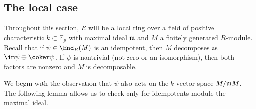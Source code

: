 \documentclass[12pt]{article}
\def\FF{\mathbb F}
\theoremstyle{theorem}
\numberwithin{thm}{section}
\theoremstyle{definition}
\begin{document}
\subsection{The local case}\label{sec:local-alg}

Throughout this section, $R$ will be a local ring over a field of positive characteristic $k \subset \overline{\FF_p}$ with maximal ideal $\mathfrak m$ and $M$ a finitely generated $R$-module. Recall that if $\psi\in\End_R(M)$ is an idempotent, then $M$ decomposes as $\im \psi \oplus \coker \psi$. If $\psi$ is nontrivial (not zero or an isomorphism), then both factors are nonzero and $M$ is decomposable.

We begin with the observation that $\psi$ also acts on the $k$-vector space $M/\mathfrak m M$. The following lemma allows us to check only for idempotents modulo the maximal ideal.
\end{document}
